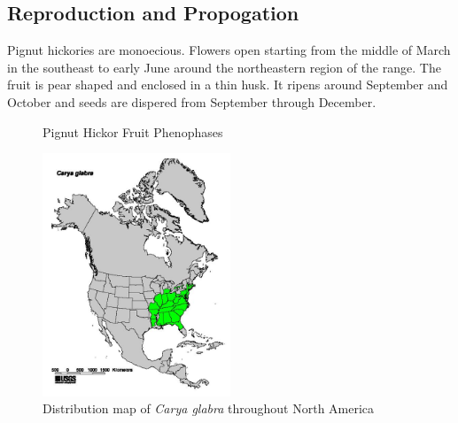 \documentclass{article}\usepackage[]{graphicx}\usepackage[]{color}
\begin{document}
\subsection*{Reproduction and Propogation}
Pignut hickories are monoecious. Flowers open starting from the middle of March in the southeast to early June around the northeastern region of the range. The fruit is pear shaped and enclosed in a thin husk. It ripens around September and October and seeds are dispered from September through December. 
\begin{figure}[ht]%
    \centering
    \qquad
    \caption{Pignut Hickor Fruit Phenophases}%
    \label{fig:example}%
\end{figure}

\begin{figure}[ht]
\includegraphics[width=0.5\textwidth]{Carya_glabra_range_map.jpg}
\centering
\caption{Distribution map of \textit{Carya glabra} throughout North America}
\end{figure}
\end{document}

